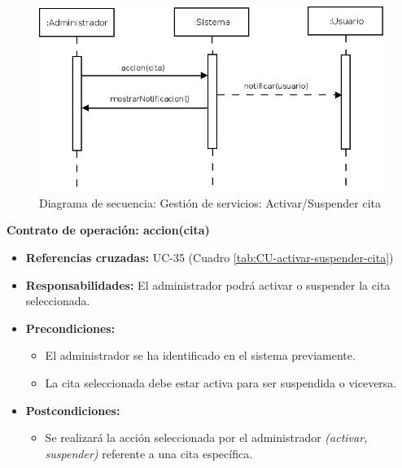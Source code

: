 \begin{figure}[h!]
\centering
  \includegraphics[scale=.55]{img/secuencias/gestion-servicios-suspender-activar-cita.jpeg}
  \caption{Diagrama de secuencia: Gestión de servicios: Activar/Suspender cita}
  \label{fig:secuencia-gestion-servicios-suspender-activar-cita}
\end{figure}

\textbf{Contrato de operación: accion(cita)}
\begin{itemize}
\item \textbf{Referencias cruzadas:} UC-35 (Cuadro \ref{tab:CU-activar-suspender-cita})
\item \textbf{Responsabilidades:} El administrador podrá activar o suspender la cita seleccionada.
\item \textbf{Precondiciones:} 
 \begin{itemize}
\item El administrador se ha identificado en el sistema previamente.
\item La cita seleccionada debe estar activa para ser suspendida o viceversa.
\end {itemize}
\item \textbf{Postcondiciones:} 
 \begin{itemize}
\item Se realizará la acción seleccionada por el administrador \textit{(activar, suspender)} referente a una cita específica.
\end {itemize}
\end {itemize}

